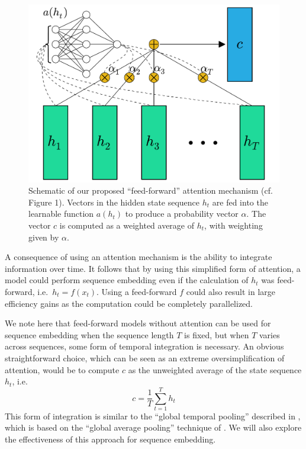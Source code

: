 \documentclass{article} %
\begin{document}
\begin{figure}
  \centering
  \includegraphics[width=.8\textwidth]{schematic.pdf}
  \caption{Schematic of our proposed ``feed-forward'' attention mechanism (cf.\ \cite{cho2015introduction} Figure 1).  Vectors in the hidden state sequence $h_t$ are fed into the learnable function $a(h_t)$ to produce a probability vector $\alpha$.  The vector $c$ is computed as a weighted average of $h_t$, with weighting given by $\alpha$.}
  \label{fig:schematic}
\end{figure}

A consequence of using an attention mechanism is the ability to integrate information over time.
It follows that by using this simplified form of attention, a model could perform sequence embedding even if the calculation of $h_t$ was feed-forward, i.e.\ $h_t = f(x_t)$.
Using a feed-forward $f$ could also result in large efficiency gains as the computation could be completely parallelized.

We note here that feed-forward models without attention can be used for sequence embedding when the sequence length $T$ is fixed, but when $T$ varies across sequences, some form of temporal integration is necessary.
An obvious straightforward choice, which can be seen as an extreme oversimplification of attention, would be to compute $c$ as the unweighted average of the state sequence $h_t$, i.e.
\begin{equation}
\label{eq:unweighted}
c = \frac{1}{T}\sum_{t = 1}^T h_t
\end{equation}
This form of integration is similar to the ``global temporal pooling'' described in \cite{dieleman2014recommending}, which is based on the ``global average pooling'' technique of \cite{lin2014network}.
We will also explore the effectiveness of this approach for sequence embedding.
\end{document}

